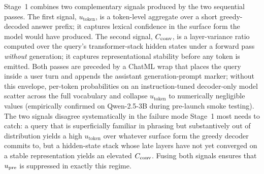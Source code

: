 Stage~1 combines two complementary signals produced by the two sequential passes. The first signal, $u_{\text{token}}$, is a token-level aggregate over a short greedy-decoded answer prefix; it captures lexical confidence in the surface form the model would have produced. The second signal, $C_{\text{conv}}$, is a layer-variance ratio computed over the query's transformer-stack hidden states under a forward pass \emph{without} generation; it captures representational stability before any token is emitted. Both passes are preceded by a ChatML wrap that places the query inside a user turn and appends the assistant generation-prompt marker; without this envelope, per-token probabilities on an instruction-tuned decoder-only model scatter across the full vocabulary and collapse $u_{\text{token}}$ to numerically negligible values (empirically confirmed on Qwen-2.5-3B during pre-launch smoke testing). The two signals disagree systematically in the failure mode Stage~1 most needs to catch: a query that is superficially familiar in phrasing but substantively out of distribution yields a high $u_{\text{token}}$ over whatever surface form the greedy decoder commits to, but a hidden-state stack whose late layers have not yet converged on a stable representation yields an elevated $C_{\text{conv}}$. Fusing both signals ensures that $u_{\text{pre}}$ is suppressed in exactly this regime.

